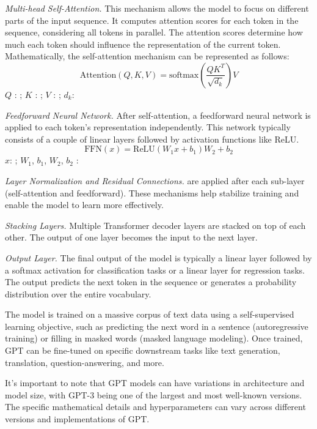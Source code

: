 {\em Multi-head Self-Attention.} This mechanism allows the model to
focus on different parts of the input sequence. It computes attention
scores for each token in the sequence, considering all tokens in
parallel. The attention scores determine how much each token should
influence the representation of the current token. Mathematically, the
self-attention mechanism can be represented as follows:
$$\text{Attention}(Q, K, V) = \text{softmax}\left(\frac{QK^T}{\sqrt{d_k}}\right)V$$
$Q$ : ; $K$ : ; $V$ : ; $d_k$: 

{\em Feedforward Neural Network.} After self-attention, a feedforward neural network is applied to each token's representation independently. This network typically consists of a couple of linear layers followed by activation functions like ReLU.
\[
\text{FFN}(x) = \text{ReLU}(W_1x + b_1)W_2 + b_2
\]
$x$: ; $W_1$, $b_1$, $W_2$, $b_2$ : 

{\em Layer Normalization and Residual Connections.} are applied after each
sub-layer (self-attention and feedforward). These mechanisms help
stabilize training and enable the model to learn more effectively.


{\em Stacking Layers.} Multiple Transformer decoder layers are stacked
on top of each other. The output of one layer becomes the input to the
next layer.

{\em Output Layer.} The final output of the model is typically a
linear layer followed by a softmax activation for classification tasks
or a linear layer for regression tasks. The output predicts the next
token in the sequence or generates a probability distribution over the
entire vocabulary.

The model is trained on a massive corpus of text data using a self-supervised learning objective, such as predicting the next word in a sentence (autoregressive training) or filling in masked words (masked language modeling). Once trained, GPT can be fine-tuned on specific downstream tasks like text generation, translation, question-answering, and more.

It's important to note that GPT models can have variations in
architecture and model size, with GPT-3 being one of the largest and
most well-known versions. The specific mathematical details and
hyperparameters can vary across different versions and implementations
of GPT.

%

